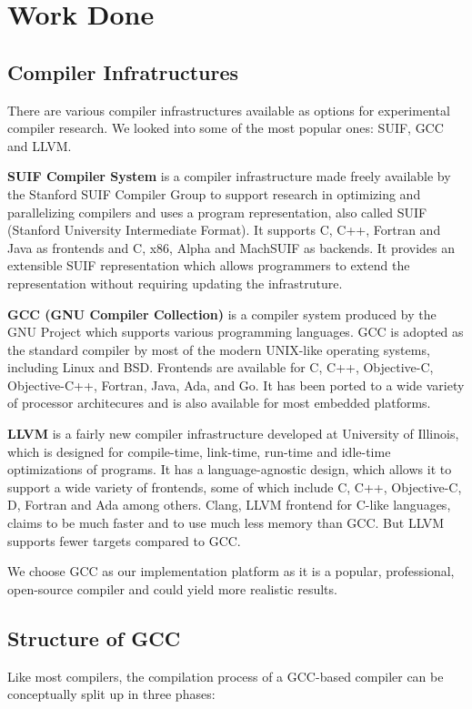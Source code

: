 \chapter{Work Done}

\section{Compiler Infratructures}
There are various compiler infrastructures available as options for experimental compiler research. We looked into some of the most popular ones: SUIF, GCC and LLVM.

\textbf{SUIF Compiler System}\cite{suif} is a compiler infrastructure made freely available by the Stanford SUIF Compiler Group to support research in optimizing and parallelizing compilers and uses a program representation, also called SUIF (Stanford University Intermediate Format). It supports C, C++, Fortran and Java as frontends and C, x86, Alpha and MachSUIF as backends. It provides an extensible SUIF representation which allows programmers to extend the representation without requiring updating the infrastruture.

\textbf{GCC (GNU Compiler Collection)}\cite{gcc} is a compiler system produced by the GNU Project which supports various programming languages. GCC is adopted as the standard compiler by most of the modern UNIX-like operating systems, including Linux and BSD. Frontends are available for C, C++, Objective-C, Objective-C++, Fortran, Java, Ada, and Go. It has been ported to a wide variety of processor architecures and is also available for most embedded platforms.

\textbf{LLVM}\cite{llvm} is a fairly new compiler infrastructure developed at University of Illinois, which is designed for compile-time, link-time, run-time and idle-time optimizations of programs. It has a language-agnostic design, which allows it to support a wide variety of frontends, some of which include C, C++, Objective-C, D, Fortran and Ada among others. Clang, LLVM frontend for C-like languages, claims to be much faster and to use much less memory than GCC\cite{clang}. But LLVM supports fewer targets compared to GCC.

We choose GCC as our implementation platform as it is a popular, professional, open-source compiler and could yield more realistic results.

\section{Structure of GCC}
Like most compilers, the compilation process of a GCC-based compiler can be conceptually split up in three phases\cite{gcc-structure}:

